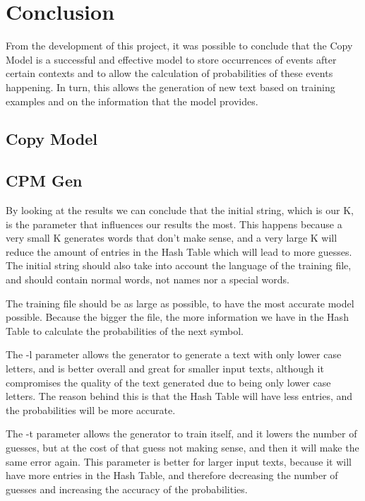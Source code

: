 \documentclass{article}
\begin{document}
\section{Conclusion}
\label{sec:conclusion}

From the development of this project, it was possible to conclude that the Copy
Model is a successful and effective model to store occurrences of events after certain contexts
and to allow the calculation of probabilities of these events happening. In turn, this allows
the generation of new text based on training examples and on the information that the
model provides.

\subsection{Copy Model}

\subsection{CPM Gen}


By looking at the results we can conclude that the initial string, which is our K, is the parameter that influences our results the most.
This happens because a very small K generates words that don't make sense, and a very large K will reduce the amount of entries 
in the Hash Table which will lead to more guesses. The initial string should also take into account the language of the training file,
and should contain normal words, not names nor a special words. 

The training file should be as large as possible, to have the most accurate model possible. Because the bigger the file, the more 
information we have in the Hash Table to calculate the probabilities of the next symbol.

The -l parameter allows the generator to generate a text with only lower case letters, and is better overall and great for smaller input texts,
although it compromises the quality of the text generated due to being only lower case letters. 
The reason behind this is that the Hash Table will have less entries, and the probabilities will be more accurate.

The -t parameter allows the generator to train itself, and it lowers the number of guesses, but at the cost of that guess not making sense,
and then it will make the same error again. This parameter is better for larger input texts, because it will have more entries in the Hash Table,
and therefore decreasing the number of guesses and increasing the accuracy of the probabilities.
\end{document}
